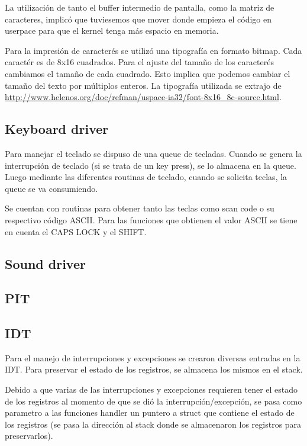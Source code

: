 \documentclass{article}
\begin{document}
La utilización de tanto el buffer intermedio de pantalla, como la matriz de caracteres, implicó que tuviesemos que mover donde empieza el código en userpace para que el kernel tenga más espacio en memoria.

Para la impresión de caracterés se utilizó una tipografía en formato bitmap. Cada caractér es de 8x16 cuadrados. Para el ajuste del tamaño de los caracterés cambiamos el tamaño de cada cuadrado. Esto implica que podemos cambiar el tamaño del texto por múltiplos enteros. La tipografía utilizada se extrajo de \url{http://www.helenos.org/doc/refman/uspace-ia32/font-8x16_8c-source.html}.

\subsection {Keyboard driver}

Para manejar el teclado se dispuso de una queue de tecladas. Cuando se genera la interrupción de teclado (si se trata de un key press), se lo almacena en la queue. Luego mediante las diferentes routinas de teclado, cuando se solicita teclas, la queue se va consumiendo.

Se cuentan con routinas para obtener tanto las teclas como scan code o su respectivo código ASCII. Para las funciones que obtienen el valor ASCII se tiene en cuenta el CAPS LOCK y el SHIFT.

\subsection {Sound driver}

\subsection {PIT}

\subsection {IDT}

Para el manejo de interrupciones y excepciones se crearon diversas entradas en la IDT. Para preservar el estado de los registros, se almacena los mismos en el stack.

Debido a que varias de las interrupciones y excepciones requieren tener el estado de los registros al momento de que se dió la interrupción/excepción, se pasa como parametro a las funciones handler un puntero a struct que contiene el estado de los registros (se pasa la dirección al stack donde se almacenaron los registros para preservarlos).
\end{document}
